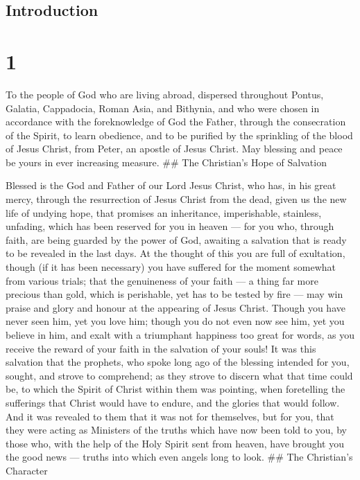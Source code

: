 \hypertarget{introduction}{%
\subsection{Introduction}\label{introduction}}

\hypertarget{section}{%
\section{1}\label{section}}

 To the people of God who are living abroad, dispersed
throughout Pontus, Galatia, Cappadocia, Roman Asia, and Bithynia,
 and who were chosen in accordance with the foreknowledge of
God the Father, through the consecration of the Spirit, to learn
obedience, and to be purified by the sprinkling of the blood of Jesus
Christ, from Peter, an apostle of Jesus Christ. May blessing and peace
be yours in ever increasing measure. \#\# The Christian's Hope of
Salvation

 Blessed is the God and Father of our Lord Jesus Christ, who
has, in his great mercy, through the resurrection of Jesus Christ from
the dead,  given us the new life of undying hope, that
promises an inheritance, imperishable, stainless, unfading, which has
been reserved for you in heaven ---  for you who, through
faith, are being guarded by the power of God, awaiting a salvation that
is ready to be revealed in the last days.  At the thought of
this you are full of exultation, though (if it has been necessary) you
have suffered for the moment somewhat from various trials; 
that the genuineness of your faith --- a thing far more precious than
gold, which is perishable, yet has to be tested by fire --- may win
praise and glory and honour at the appearing of Jesus Christ.
 Though you have never seen him, yet you love him; though
you do not even now see him, yet you believe in him, and exalt with a
triumphant happiness too great for words,  as you receive
the reward of your faith in the salvation of your souls! 
It was this salvation that the prophets, who spoke long ago of the
blessing intended for you, sought, and strove to comprehend;
 as they strove to discern what that time could be, to
which the Spirit of Christ within them was pointing, when foretelling
the sufferings that Christ would have to endure, and the glories that
would follow.  And it was revealed to them that it was not
for themselves, but for you, that they were acting as Ministers of the
truths which have now been told to you, by those who, with the help of
the Holy Spirit sent from heaven, have brought you the good news ---
truths into which even angels long to look. \#\# The Christian's
Character

